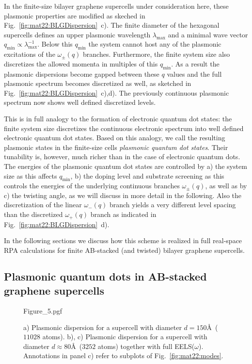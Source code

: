 In the finite-size bilayer graphene supercells under consideration here, these plasmonic properties are modified as skeched in Fig.~\ref{fig:mat22:BLGDispersion}~c). The finite diameter of the hexagonal supercells defines an upper plasmonic wavelength $\lambda_\text{max}$ and a minimal wave vector $q_\text{min} \propto \lambda_\text{max}^{-1}$. Below this $q_\text{min}$ the system cannot host any of the plasmonic excitations of the $\omega_{\pm}(q)$ branches. Furthermore, the finite system size also discretizes the allowed momenta in multiples of this $q_\text{min}$. As a result the plasmonic dispersions become gapped between these $q$ values and the full plasmonic spectrum becomes discretized as well, as sketched in Fig.~\ref{fig:mat22:BLGDispersion}~c),d). The previously continuous plasmonic spectrum now shows well defined discretized levels.

This is in full analogy to the formation of electronic quantum dot states: the finite system size discretizes the continuous electronic spectrum into well defined electronic quantum dot states. Based on this analogy, we call the resulting plasmonic states in the finite-size cells \emph{plasmonic quantum dot states}.  Their tunability is, however, much richer than in the case of electronic quantum dots. The energies of the plasmonic quantum dot states are controlled by a) the system size as this affects $q_\text{min}$, b) the doping level and substrate screening as this controls the energies of the underlying continuous branches $\omega_{\pm}(q)$, as well as by c) the twisting angle, as we will discuss in more detail in the following. Also the discretization of the linear $\omega_-(q)$ branch yields a very different level spacing than the discretized $\omega_+(q)$ branch as indicated in Fig.~\ref{fig:mat22:BLGDispersion}~d).

In the following sections we discuss how this scheme is realized in full real-space RPA calculations for finite AB-stacked (and twisted) bilayer graphene supercells.
    
\subsection{Plasmonic quantum dots in AB-stacked graphene supercells}
    
\begin{figure}
    \centering
    {Figure_5.pgf}
    \caption{a) Plasmonic dispersion for a supercell with diameter $d=150$\AA\ ($11028$ atoms). b), c) Plasmonic dispersion for a supercell with diameter $d\approx80$\AA\ ($3252$ atoms) together with full EELS($\omega$). Annotations in panel c) refer to subplots of Fig.~\ref{fig:mat22:modes}.}
    \label{fig:mat22:EELS}
\end{figure}
        

